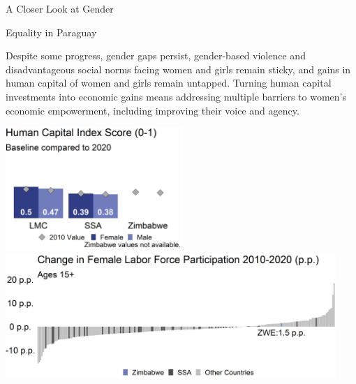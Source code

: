 \documentclass[
]{article}
\begin{document}
\begin{minipage}[c][1.4cm][t]{19.5cm}
\begin{minipage}[c][1.4cm][t]{6.2cm}
\fontsize{14}{1}\selectfont   
A Closer Look at Gender
  
\vspace{.2cm}
  
Equality in Paraguay
\normalsize
\end{minipage}\hspace{0.3cm}
\begin{minipage}[c][1.4cm][t]{12.75cm}
\fontsize{9}{8}\selectfont   
Despite some progress, gender gaps persist, gender-based violence and disadvantageous social norms facing women and girls remain sticky, and gains in human capital of women and girls remain untapped. Turning human capital investments into economic gains means addressing multiple barriers to women’s economic empowerment, including improving their voice and agency.
\normalsize
\end{minipage}
\end{minipage}

\vspace{.4cm}

\begin{minipage}[t][4.7cm][t]{19.5cm}
\href{https://genderdata.worldbank.org/indicators/hd-hci-ovrl}{\includegraphics[height=4.7cm]{HCIplot.png}}\hspace{.2cm}
\href{https://genderdata.worldbank.org/indicators/sl-tlf-acti-zs/}{\includegraphics[height=4.7cm]{LFPplot.png}}  
\end{minipage}
\end{document}

